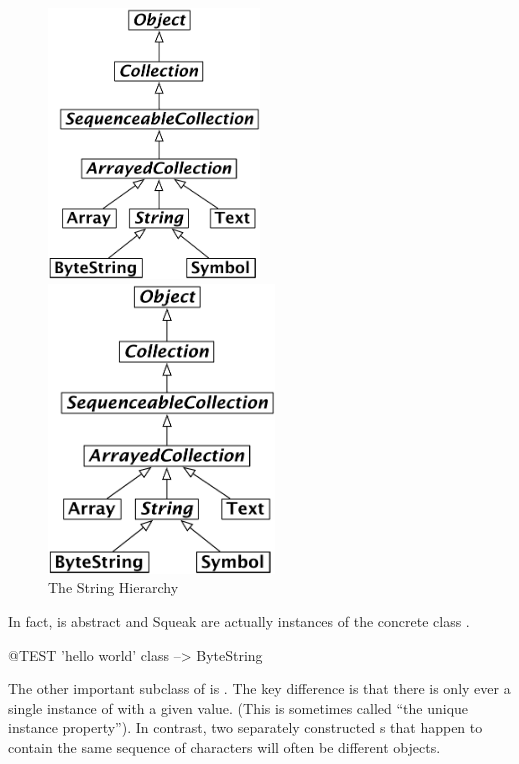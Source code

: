 \documentclass[a4paper,10pt,twoside]{book}
\begin{document}
\begin{figure}[ht]
\ifluluelse
	{\centerline {\includegraphics[width=0.5\textwidth]{StringHierarchy}}}
	{\centerline {\includegraphics[width=6cm]{StringHierarchy}}}
\caption{The String Hierarchy \label{fig:strings}}
\end{figure}

In fact,  is abstract and Squeak  are actually instances of the concrete class .

\begin{code}{@TEST}
'hello world' class --> ByteString
\end{code}

The other important subclass of  is .  The key difference is that there is only ever a single instance of   with a given value.  (This is sometimes called ``the unique instance property'').  In contrast, two separately constructed s that happen to contain the same sequence of characters will often be different objects.
\end{document}
